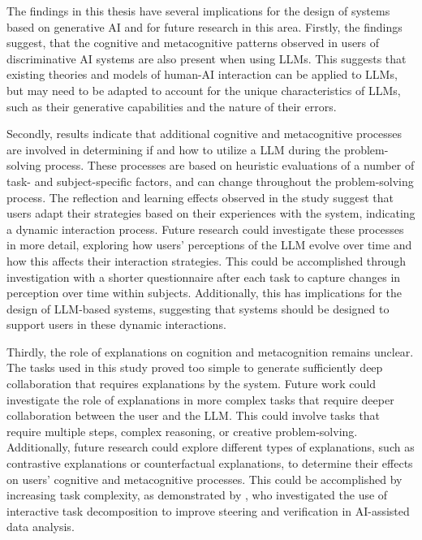 The findings in this thesis have several implications for the design of systems based on generative \ac{AI} and for future research in this area. Firstly, the findings suggest, that the cognitive and metacognitive patterns observed in users of discriminative \ac{AI} systems are also present when using \acp{LLM}. This suggests that existing theories and models of human-AI interaction can be applied to \acp{LLM}, but may need to be adapted to account for the unique characteristics of \acp{LLM}, such as their generative capabilities and the nature of their errors.

Secondly, results indicate that additional cognitive and metacognitive processes are involved in determining if and how to utilize a \ac{LLM} during the problem-solving process. These processes are based on heuristic evaluations of a number of task- and subject-specific factors, and can change throughout the problem-solving process. The reflection and learning effects observed in the study suggest that users adapt their strategies based on their experiences with the system, indicating a dynamic interaction process. Future research could investigate these processes in more detail, exploring how users' perceptions of the \ac{LLM} evolve over time and how this affects their interaction strategies. This could be accomplished through investigation with a shorter questionnaire after each task to capture changes in perception over time within subjects. Additionally, this has implications for the design of \ac{LLM}-based systems, suggesting that systems should be designed to support users in these dynamic interactions.

Thirdly, the role of explanations on cognition and metacognition remains unclear. The tasks used in this study proved too simple to generate sufficiently deep collaboration that requires explanations by the system. Future work could investigate the role of explanations in more complex tasks that require deeper collaboration between the user and the \ac{LLM}. This could involve tasks that require multiple steps, complex reasoning, or creative problem-solving. Additionally, future research could explore different types of explanations, such as contrastive explanations or counterfactual explanations, to determine their effects on users' cognitive and metacognitive processes. This could be accomplished by increasing task complexity, as demonstrated by \textcite{Kazemitabaar2024}, who investigated the use of interactive task decomposition to improve steering and verification in AI-assisted data analysis.

